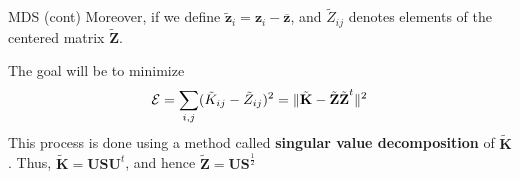 \documentclass{beamer}
\begin{document}
\begin{frame}{MDS (cont)}
	Moreover, if we define $\tilde{\textbf{z}}_i = \textbf{z}_i - \overline{\textbf{z}}$, and $\tilde{Z}_{ij}$ denotes elements of the centered matrix $\tilde{\textbf{Z}}$.
	
	The goal will be to minimize 
	\begin{equation*}
		{\cal E}= \sum_{i,j} ( \tilde{K}_{ij} - \tilde{Z}_{ij})^2= \| \tilde{\textbf{K}}- \tilde{\textbf{Z}}\tilde{\textbf{Z}}^t \|^2
	\end{equation*}
	This process is done using a method called \textbf{singular value decomposition} of $\tilde{\textbf{K}}$. Thus, $\tilde{\textbf{K}}=\textbf{U} \textbf{S} \textbf{U}^t$, and hence $\tilde{\textbf{Z}}= \textbf{U} \textbf{S}^{\frac{1}{2}}$
\end{frame}


%
%
\end{document}
